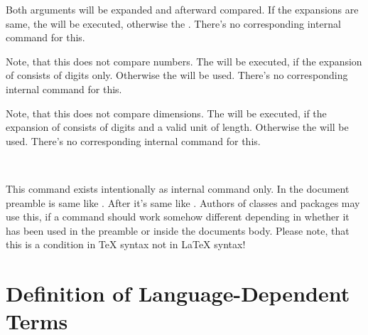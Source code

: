 \begin{Declaration}
\end{Declaration}
%
Both  arguments will be expanded and afterward compared. If the
expansions are same, the  will be
executed, otherwise the . There's no corresponding
internal command for this.
%
%


\begin{Declaration}
\end{Declaration}
%
Note, that this does not compare numbers.  The  will
be executed, if the expansion of  consists of digits
only. Otherwise the  will be used. There's no
corresponding internal command for this.
%
%


\begin{Declaration}
\end{Declaration}
%
Note, that this does not compare dimensions. The  will
be executed, if the expansion of  consists of digits and a valid
unit of length. Otherwise the  will be used. There's no
corresponding internal command for this.
%
%


\begin{Declaration}
  \  
  \  
\end{Declaration}
%
This command exists intentionally as internal command only. In the document
preamble  is same like . After
 it's same like . Authors of
classes and packages may use this, if a command should work somehow different
depending in whether it has been used in the preamble or inside the documents
body. Please note, that this is a condition in \TeX{}
syntax not in \LaTeX{} syntax!
%
%


\section{Definition of Language-Dependent Terms}
\label{sec:scrbase.languageSupport}

